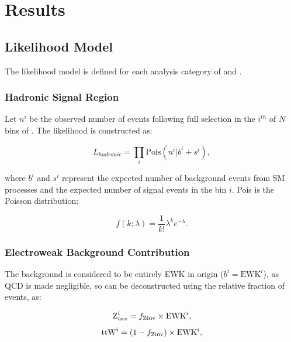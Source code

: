 \chapter{Results}
\label{ch:7}

\ifpdf
    \graphicspath{{Chapter7/Figs/Raster/}{Chapter7/Figs/PDF/}{Chapter7/Figs/}}
\else
    \graphicspath{{Chapter7/Figs/Vector/}{Chapter7/Figs/}}
\fi


\section{Likelihood Model}  %
\label{sec:results_likelihood}
The likelihood model is defined for each analysis category of \nb and \nj.

\subsection{Hadronic Signal Region}

Let $n^i$ be the observed number of events 
following full selection in the $i^{th}$ of $N$ bins of \HT. The likelihood is 
constructed as:

\begin{equation}
L_{hadronic} = \prod_i \text{Pois}(n^i | b^i + s^i),
\end{equation}

where $b^i$ and $s^i$ represent the expected number of background events from SM 
processes and the expected number of signal events in the bin $i$. Pois is 
the Poisson distribution:

\begin{equation}
f(k;\lambda) = \frac{1}{k!}\lambda^k e^{-\lambda}.
\end{equation}


\subsection{Electroweak Background Contribution}
The background is considered to be entirely EWK in origin ($b^i = \text{EWK}^i$), as QCD
is made negligible, so can be deconstructed using the relative fraction
of \zinv events, \fzinv as:

\begin{equation}
\text{Z}_{inv}^i = f_{\text{Zinv}} \times \text{EWK}^i,
\label{eq:ewk_frac_z}
\end{equation}
\begin{equation}
\text{ttW}^i = (1-f_{\text{Zinv}}) \times \text{EWK}^i,
\label{eq:ewk_frac_ttw}
\end{equation}

